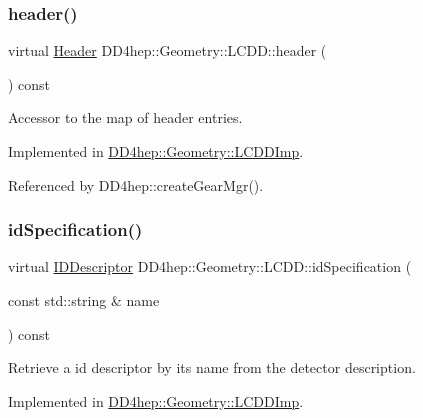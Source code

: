 \subsubsection{\texorpdfstring{header()}{header()}}
{\footnotesize\ttfamily virtual \hyperlink{class_d_d4hep_1_1_geometry_1_1_header}{Header} D\+D4hep\+::\+Geometry\+::\+L\+C\+D\+D\+::header (\begin{DoxyParamCaption}{ }\end{DoxyParamCaption}) const\hspace{0.3cm}{\ttfamily [pure virtual]}}



Accessor to the map of header entries. 



Implemented in \hyperlink{class_d_d4hep_1_1_geometry_1_1_l_c_d_d_imp_a56791e681806ce40fa0e9214a57f41f5}{D\+D4hep\+::\+Geometry\+::\+L\+C\+D\+D\+Imp}.



Referenced by D\+D4hep\+::create\+Gear\+Mgr().

\hypertarget{class_d_d4hep_1_1_geometry_1_1_l_c_d_d_ac08b5db047061a7b08d8b78bd7cb5e72}{}\label{class_d_d4hep_1_1_geometry_1_1_l_c_d_d_ac08b5db047061a7b08d8b78bd7cb5e72} 
\subsubsection{\texorpdfstring{id\+Specification()}{idSpecification()}}
{\footnotesize\ttfamily virtual \hyperlink{class_d_d4hep_1_1_geometry_1_1_i_d_descriptor}{I\+D\+Descriptor} D\+D4hep\+::\+Geometry\+::\+L\+C\+D\+D\+::id\+Specification (\begin{DoxyParamCaption}\item[{const std\+::string \&}]{name }\end{DoxyParamCaption}) const\hspace{0.3cm}{\ttfamily [pure virtual]}}



Retrieve a id descriptor by it\textquotesingle{}s name from the detector description. 



Implemented in \hyperlink{class_d_d4hep_1_1_geometry_1_1_l_c_d_d_imp_ac1c41466210f2580c625260ea424b1b4}{D\+D4hep\+::\+Geometry\+::\+L\+C\+D\+D\+Imp}.

